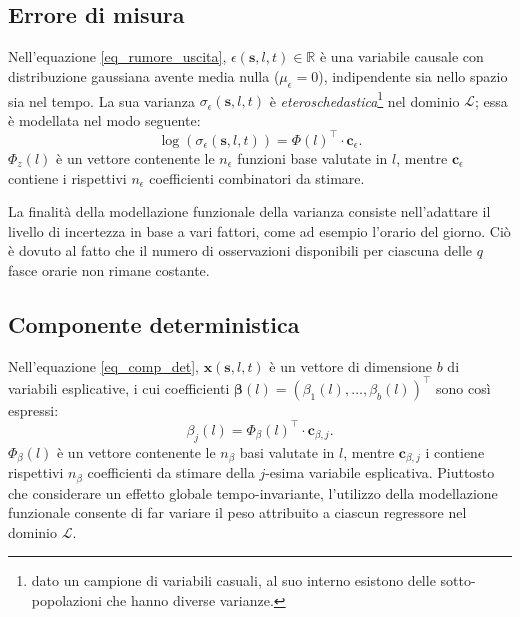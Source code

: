 \subsection[Rumore sull'uscita]{Errore di misura}
Nell'equazione \ref{eq_rumore_uscita}, $\epsilon (\mathbf{s}, l, t)\in\mathbb{R}$ è una variabile causale con distribuzione gaussiana avente media nulla ($\mu_\epsilon = 0$), indipendente sia nello spazio sia nel tempo. La sua varianza $\sigma_\epsilon(\mathbf{s}, l, t)$ è \textit{eteroschedastica}\footnote{dato un campione di variabili casuali, al suo interno esistono delle sotto-popolazioni che hanno diverse varianze.} nel dominio $\mathcal{L}$; essa è modellata nel modo seguente:
\[
	\log(\sigma_\epsilon(\mathbf{s}, l, t)) = \Phi(l)^\top\cdot\mathbf{c}_\epsilon.
\]
$\Phi_z(l)$ è un vettore contenente le $n_\epsilon$ funzioni base valutate in $l$, mentre $\mathbf{c}_\epsilon$ contiene i rispettivi $n_\epsilon$ coefficienti combinatori da stimare. \par La finalità della modellazione funzionale della varianza consiste nell'adattare il livello di incertezza in base a vari fattori, come ad esempio l'orario del giorno. Ciò è dovuto al fatto che il numero di osservazioni disponibili per ciascuna delle $q$ fasce orarie non rimane costante.

\subsection[Componente deterministica]{Componente deterministica}
Nell'equazione \ref{eq_comp_det}, $\mathbf{x}(\mathbf{s}, l, t)$ è un vettore di dimensione $b$ di variabili esplicative, i cui coefficienti $\boldsymbol{\beta}(l) = (\beta_1(l),\dots,\beta_b(l))^\top$ sono così espressi:
\[
	\beta_j(l) = \Phi_\beta(l)^\top\cdot\mathbf{c}_{\beta, j}.
\]
$\Phi_\beta(l)$ è un vettore contenente le $n_\beta$ basi valutate in $l$, mentre $\mathbf{c}_{\beta, j}$ i contiene rispettivi $n_\beta$ coefficienti da stimare della $j$-esima variabile esplicativa. Piuttosto che considerare un effetto globale tempo-invariante, l'utilizzo della modellazione funzionale consente di far variare il peso attribuito a ciascun regressore nel dominio $\mathcal{L}$.

